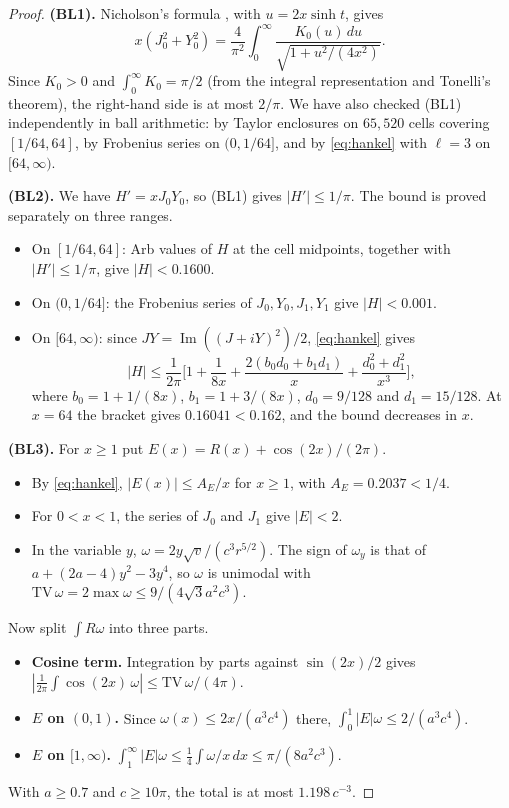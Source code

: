 \documentclass[11pt]{amsart}
\theoremstyle{remark}
\numberwithin{equation}{section}
\begin{document}
\begin{proof}
\textbf{(BL1).} Nicholson's formula \cite[10.9.30]{DLMF}, with $u=2x\sinh t$, gives
\[
x(J_0^2+Y_0^2)=\frac4{\pi^2}\int_0^\infty\frac{K_0(u)\,du}{\sqrt{1+u^2/(4x^2)}}.
\]
Since $K_0>0$ and $\int_0^\infty K_0=\pi/2$ (from the integral representation \cite[10.32.9]{DLMF} and Tonelli's theorem), the right-hand side is at most $2/\pi$. We have also checked (BL1) independently in ball arithmetic: by Taylor enclosures on $65{,}520$ cells covering $[1/64,64]$, by Frobenius series on $(0,1/64]$, and by \eqref{eq:hankel} with $\ell=3$ on $[64,\infty)$.

\textbf{(BL2).} We have $H'=xJ_0Y_0$, so (BL1) gives $|H'|\le1/\pi$. The bound is proved separately on three ranges.
\begin{itemize}
\item On $[1/64,64]$: Arb values of $H$ at the cell midpoints, together with $|H'|\le1/\pi$, give $|H|<0.1600$.
\item On $(0,1/64]$: the Frobenius series of $J_0,Y_0,J_1,Y_1$ give $|H|<0.001$.
\item On $[64,\infty)$: since $JY=\operatorname{Im}((J+iY)^2)/2$, \eqref{eq:hankel} gives
\[
|H|\le\frac1{2\pi}\Big[1+\frac1{8x}+\frac{2(b_0d_0+b_1d_1)}x+\frac{d_0^2+d_1^2}{x^3}\Big],
\]
where $b_0=1+1/(8x)$, $b_1=1+3/(8x)$, $d_0=9/128$ and $d_1=15/128$. At $x=64$ the bracket gives $0.16041<0.162$, and the bound decreases in $x$.
\end{itemize}

\textbf{(BL3).} For $x\ge1$ put $E(x)=R(x)+\cos(2x)/(2\pi)$.
\begin{itemize}
\item By \eqref{eq:hankel}, $|E(x)|\le A_E/x$ for $x\ge1$, with $A_E=0.2037<1/4$.
\item For $0<x<1$, the series of $J_0$ and $J_1$ give $|E|<2$.
\item In the variable $y$, $\omega=2y\sqrt v/(c^3r^{5/2})$. The sign of $\omega_y$ is that of $a+(2a-4)y^2-3y^4$, so $\omega$ is unimodal with $\mathrm{TV}\,\omega=2\max\omega\le9/(4\sqrt3a^2c^3)$.
\end{itemize}
Now split $\int R\omega$ into three parts.
\begin{itemize}
\item \textbf{Cosine term.} Integration by parts against $\sin(2x)/2$ gives $|\frac1{2\pi}\int\cos(2x)\,\omega|\le\mathrm{TV}\,\omega/(4\pi)$.
\item \textbf{$E$ on $(0,1)$.} Since $\omega(x)\le2x/(a^3c^4)$ there, $\int_0^1|E|\omega\le2/(a^3c^4)$.
\item \textbf{$E$ on $[1,\infty)$.} $\int_1^\infty|E|\omega\le\frac14\int\omega/x\,dx\le\pi/(8a^2c^3)$.
\end{itemize}
With $a\ge0.7$ and $c\ge10\pi$, the total is at most $1.198\,c^{-3}$.
\end{proof}
\end{document}
